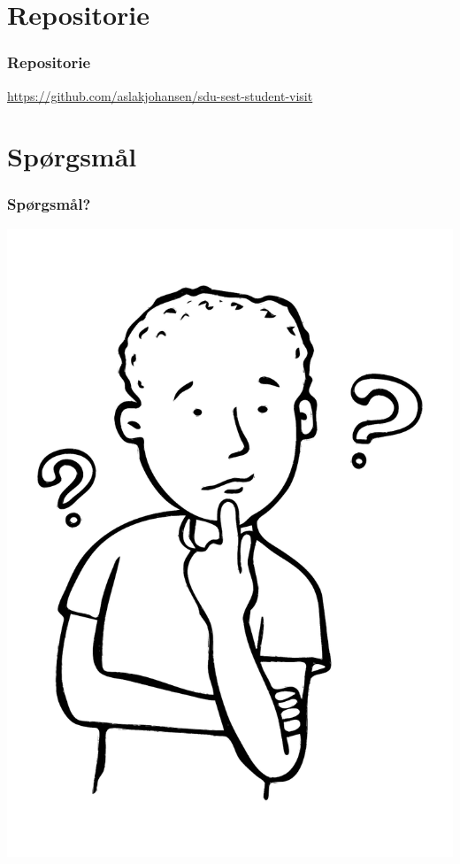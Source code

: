 \section{Repositorie}
\begin{frame}
    \frametitle{Repositorie}
    \begin{center}
      \url{https://github.com/aslakjohansen/sdu-sest-student-visit}
    \end{center}
\end{frame}

\section{Spørgsmål}
\begin{frame}
    \frametitle{\textbf{Spørgsmål?}}
    \vspace{-15mm}
    \begin{center}
        \includegraphics[scale=0.4]{./figs/Boy-asking-question.pdf}
    \end{center}
    \vspace{-25mm}
\end{frame}

